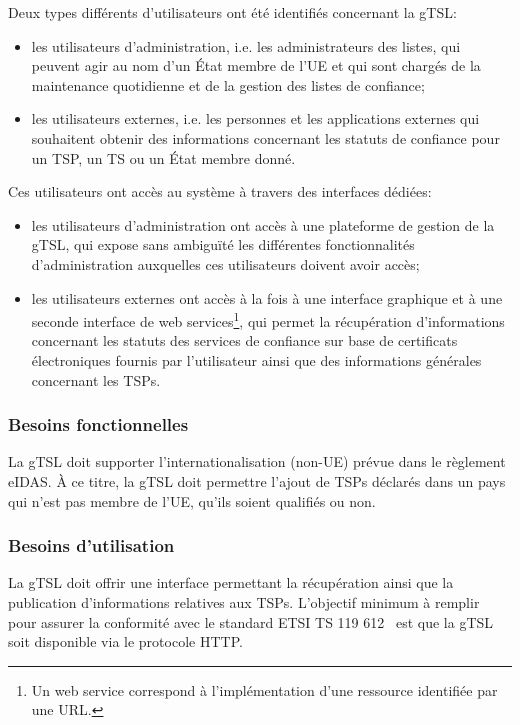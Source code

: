 \documentclass{tnreport}
\begin{document}
Deux types différents d'utilisateurs ont été identifiés concernant la gTSL:
\begin{itemize}
	\item les utilisateurs d'administration, i.e. les administrateurs des listes, qui peuvent agir au nom d'un État membre de l'UE et qui sont chargés de la maintenance quotidienne et de la gestion des listes de confiance;
	\item les utilisateurs externes, i.e. les personnes et les applications externes qui souhaitent obtenir des informations concernant les statuts de confiance pour un TSP, un TS ou un État membre donné.
	\newline
\end{itemize}

Ces utilisateurs ont accès au système à travers des interfaces dédiées:
\begin{itemize}
	\item les utilisateurs d'administration ont accès à une plateforme de gestion de la gTSL, qui expose sans ambiguïté les différentes fonctionnalités d'administration auxquelles ces utilisateurs doivent avoir accès;
	\item les utilisateurs externes ont accès à la fois à une interface graphique et à une seconde interface de web services\footnote{Un web service correspond à l'implémentation d'une ressource identifiée par une URL.}, qui permet la récupération d'informations concernant les statuts des services de confiance sur base de certificats électroniques fournis par l'utilisateur ainsi que des informations générales concernant les TSPs.
\end{itemize}

\subsubsection{Besoins fonctionnelles}

La gTSL doit supporter l'internationalisation (non-UE) prévue dans le règlement eIDAS. À ce titre, la gTSL doit permettre l'ajout de TSPs déclarés dans un pays qui n'est pas membre de l'UE, qu'ils soient qualifiés ou non.

\subsubsection{Besoins d'utilisation}

La gTSL doit offrir une interface permettant la récupération ainsi que la publication d'informations relatives aux TSPs. L'objectif minimum à remplir pour assurer la conformité avec le standard ETSI TS 119 612~\cite{ETSITS119612} est que la gTSL soit disponible via le protocole HTTP.
\end{document}
